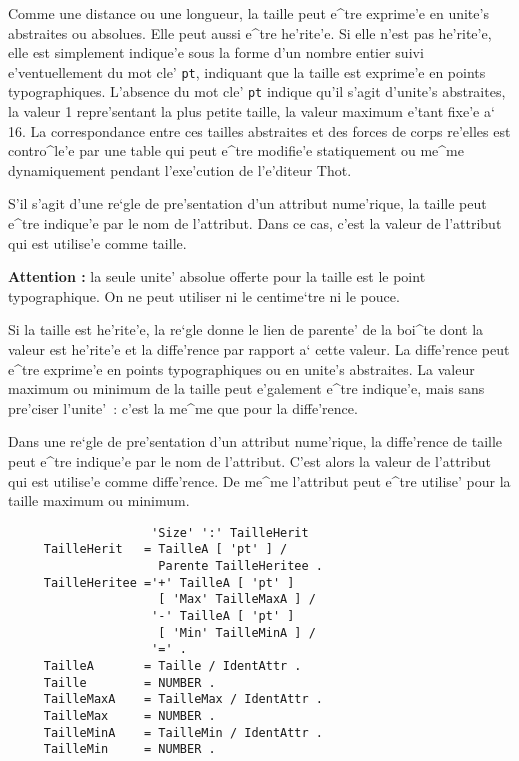 {Comme une distance ou une longueur, la taille peut e^tre exprime'e en
unite's abstraites ou absolues. Elle peut aussi e^tre he'rite'e. Si elle
n'est pas he'rite'e, elle est simplement indique'e sous la forme d'un
nombre entier suivi e'ventuellement du mot cle' {\tt pt}, indiquant que
la taille est exprime'e en points typographiques. L'absence du mot cle'
{\tt pt} indique qu'il s'agit d'unite's abstraites, la valeur 1 repre'sentant
la plus petite taille, la valeur maximum e'tant fixe'e a` 16. La correspondance
entre ces tailles abstraites et des forces de corps re'elles est contro^le'e
par une table qui peut e^tre modifie'e statiquement ou me^me dynamiquement
pendant l'exe'cution de l'e'diteur Thot.

S'il s'agit d'une re`gle de pre'sentation d'un attribut nume'rique, la taille
peut e^tre indique'e par le nom de l'attribut. Dans ce cas, c'est la valeur de
l'attribut qui est utilise'e comme taille.

{\bf Attention :} la seule unite' absolue offerte pour la taille est le
point typographique. On ne peut utiliser ni le centime`tre ni le pouce.

Si la taille est he'rite'e, la re`gle donne le lien de parente' de la boi^te
dont la valeur est he'rite'e et la diffe'rence par rapport a` cette valeur.
La diffe'rence peut e^tre exprime'e en points typographiques ou en unite's
abstraites. La valeur maximum ou minimum de la taille peut e'galement
e^tre indique'e, mais sans pre'ciser l'unite'~: c'est la me^me que pour la
diffe'rence.

Dans une re`gle de pre'sentation d'un attribut nume'rique, la diffe'rence de
taille peut e^tre indique'e par le nom de l'attribut. C'est alors la valeur de
l'attribut qui est utilise'e comme diffe'rence. De me^me l'attribut peut e^tre
utilise' pour la taille maximum ou minimum.

\begin{verbatim}
                    'Size' ':' TailleHerit
     TailleHerit   = TailleA [ 'pt' ] /
                     Parente TailleHeritee .
     TailleHeritee ='+' TailleA [ 'pt' ]
                     [ 'Max' TailleMaxA ] /
                    '-' TailleA [ 'pt' ]
                     [ 'Min' TailleMinA ] /
                    '=' .
     TailleA       = Taille / IdentAttr .
     Taille        = NUMBER .
     TailleMaxA    = TailleMax / IdentAttr .
     TailleMax     = NUMBER .
     TailleMinA    = TailleMin / IdentAttr .
     TailleMin     = NUMBER .
\end{verbatim}

}
